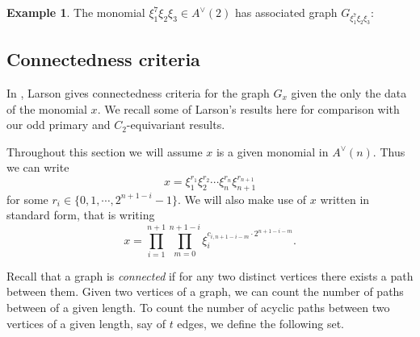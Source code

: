 \documentclass{amsart}
\theoremstyle{definition}
\newtheorem{example}[theorem]{Example}
\theoremstyle{plain}
\numberwithin{theorem}{section}
\numberwithin{equation}{section}
\numberwithin{figure}{section}
\newcommand{\0}{\langle 0 \rangle }
\begin{document}
\begin{example}
    The monomial $\xi_1^7 \xi_2 \xi_3 \in A^\vee (2)$ has associated graph $G_{\xi_1^7 \xi_2 \xi_3}${:}
    \vspace{1em}
        \begin{center}
    \end{center}
\end{example}

\subsection{Connectedness criteria} In \cite{Larson22}, Larson gives connectedness criteria for the graph $G_x$ given the only the data of the monomial $x$. We recall some of Larson's results here for comparison with our odd primary and $C_2$-equivariant results. 

Throughout this section we will assume $x$ is a given monomial in $A^\vee(n)$. Thus we can write 
\[
x = \xi_1^{r_1} \xi_2^{r_2} \cdots \xi_n^{r_n} \xi_{n + 1}^{r_{n + 1}}
\]
for some $r_i \in \{0,1,\cdots, 2^{n + 1 - i} - 1\}$. We will also make use of $x$ written { in standard form}, that is writing
\[
x = \prod_{i=1}^{n + 1} \prod_{m = 0}^{{n+1-i}} \xi_i^{c_{i, n + 1 - i - m} \cdot 2^{n + 1 - i - m}}.
\]

Recall that a graph is \textit{connected} if for any two distinct vertices there exists a path between them. Given two vertices of a graph, we can count the number of paths between of a given length. To count the number of acyclic paths between two vertices of a given length, say of $t$ edges, we define the following set. 
\end{document}
